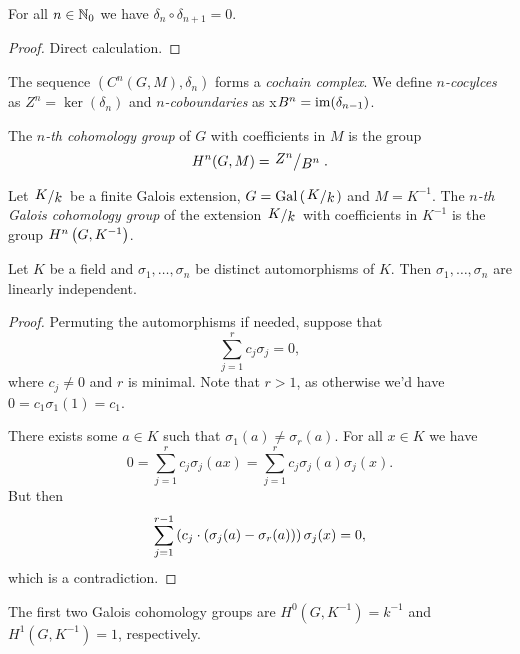 \begin{trditev}
For all $n \in \mathbb{N}_0$ we have $\delta_n \circ \delta_{n+1} = 0$.
\end{trditev}

\begin{proof}
Direct calculation.
\end{proof}


\begin{definicija}
The sequence $(C^n(G, M), \delta_n)$ forms a
\emph{cochain complex}. We define
\emph{$n$-cocylces} as $Z^n = \ker(\delta_n)$ and
\emph{$n$-coboundaries} as
x$B^n = \operatorname{im}(\delta_{n-1})$.
\end{definicija}

\begin{definicija}
The \emph{$n$-th cohomology group} of $G$
with coefficients in $M$ is the group
\[
H^n(G, M) = \kvoc{Z^n}{B^n}.
\]
\end{definicija}

\begin{definicija}
Let $\kvoc{K}{k}$ be a finite Galois extension,
$G = \Gal \br{\kvoc{K}{k}}$ and $M = K^{-1}$. The
\emph{$n$-th Galois cohomology group}
of the extension $\kvoc{K}{k}$ with coefficients in $K^{-1}$ is the
group $H^n \left(G, K^{-1}\right)$.
\end{definicija}

\begin{lema}
Let $K$ be a field and $\sigma_1, \dots, \sigma_n$ be distinct
automorphisms of $K$. Then $\sigma_1, \dots, \sigma_n$ are linearly
independent.
\end{lema}

\begin{proof}
Permuting the automorphisms if needed, suppose that
\[
\sum_{j=1}^r c_j \sigma_j = 0,
\]
where $c_j \ne 0$ and $r$ is minimal. Note that $r > 1$, as
otherwise we'd have $0 = c_1 \sigma_1(1) = c_1$.

There exists some $a \in K$ such that
$\sigma_1(a) \ne \sigma_r(a)$. For all $x \in K$ we have
\[
0 =
\sum_{j=1}^r c_j \sigma_j(ax) =
\sum_{j=1}^r c_j \sigma_j(a) \sigma_j(x).
\]
But then
\[
\sum_{j=1}^{r-1}
\left(c_j \cdot \left(\sigma_j(a) - \sigma_r(a)\right)\right) \sigma_j(x) = 0,
\]
which is a contradiction.
\end{proof}

\begin{izrek}
The first two Galois cohomology groups are
$H^0(G, K^{-1}) = k^{-1}$ and $H^1(G, K^{-1}) = 1$, respectively.
\end{izrek}

